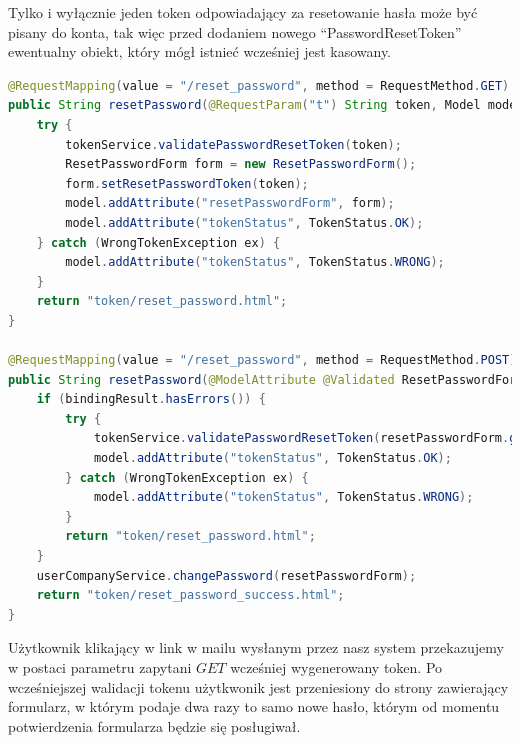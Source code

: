 \documentclass[a4paper]{article}
\begin{document}
Tylko i wyłącznie jeden token odpowiadający za resetowanie hasła może być pisany do konta, tak więc przed dodaniem nowego ``PasswordResetToken'' ewentualny obiekt, który mógł istnieć wcześniej jest kasowany.
\begin{lstlisting}[language=Java,tabsize=2,frame=single,breaklines=true]
@RequestMapping(value = "/reset_password", method = RequestMethod.GET)
public String resetPassword(@RequestParam("t") String token, Model model) {
	try {
		tokenService.validatePasswordResetToken(token);
		ResetPasswordForm form = new ResetPasswordForm();
		form.setResetPasswordToken(token);
		model.addAttribute("resetPasswordForm", form);
		model.addAttribute("tokenStatus", TokenStatus.OK);
	} catch (WrongTokenException ex) {
		model.addAttribute("tokenStatus", TokenStatus.WRONG);
	}
	return "token/reset_password.html";
}

@RequestMapping(value = "/reset_password", method = RequestMethod.POST)
public String resetPassword(@ModelAttribute @Validated ResetPasswordForm resetPasswordForm, BindingResult bindingResult, Model model) {
	if (bindingResult.hasErrors()) {
		try {
			tokenService.validatePasswordResetToken(resetPasswordForm.getResetPasswordToken());
			model.addAttribute("tokenStatus", TokenStatus.OK);
		} catch (WrongTokenException ex) {
			model.addAttribute("tokenStatus", TokenStatus.WRONG);
		}
		return "token/reset_password.html";
	}
	userCompanyService.changePassword(resetPasswordForm);
	return "token/reset_password_success.html";
}
\end{lstlisting}
Użytkownik klikający w link w mailu wysłanym przez nasz system przekazujemy w postaci parametru zapytani $GET$ wcześniej wygenerowany token. Po wcześniejszej walidacji tokenu użytkwonik jest przeniesiony do strony zawierający formularz, w którym podaje dwa razy to samo nowe hasło, którym od momentu potwierdzenia formularza będzie się posługiwał.
\end{document}
